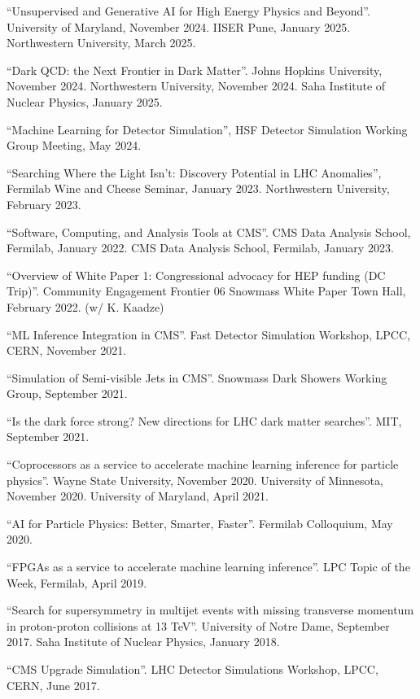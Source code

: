 \begin{description}[leftmargin=12pt,font=\normalfont,labelsep=0em]
\item ``Unsupervised and Generative AI for High Energy Physics and Beyond''. University of Maryland, November 2024. IISER Pune, January 2025. Northwestern University, March 2025.
\item ``Dark QCD: the Next Frontier in Dark Matter''. Johns Hopkins University, November 2024. Northwestern University, November 2024. Saha Institute of Nuclear Physics, January 2025.
\item ``Machine Learning for Detector Simulation'', HSF Detector Simulation Working Group Meeting, May 2024.
\item ``Searching Where the Light Isn't: Discovery Potential in LHC Anomalies'', Fermilab Wine and Cheese Seminar, January 2023. Northwestern University, February 2023.
\item ``Software, Computing, and Analysis Tools at CMS''. CMS Data Analysis School, Fermilab, January 2022. CMS Data Analysis School, Fermilab, January 2023.
\item ``Overview of White Paper 1: Congressional advocacy for HEP funding (DC Trip)''. Community Engagement Frontier 06 Snowmass White Paper Town Hall, February 2022. (w/ K. Kaadze)
\item ``ML Inference Integration in CMS''. Fast Detector Simulation Workshop, LPCC, CERN, November 2021.
\item ``Simulation of Semi-visible Jets in CMS''. Snowmass Dark Showers Working Group, September 2021.
\item ``Is the dark force strong? New directions for LHC dark matter searches''. MIT, September 2021.
\item ``Coprocessors as a service to accelerate machine learning inference for particle physics''. Wayne State University, November 2020. University of Minnesota, November 2020. University of Maryland, April 2021.
\item ``AI for Particle Physics: Better, Smarter, Faster''. Fermilab Colloquium, May 2020.
\item ``FPGAs as a service to accelerate machine learning inference''. LPC Topic of the Week, Fermilab, April 2019.
\item ``Search for supersymmetry in multijet events with missing transverse momentum in proton-proton collisions at 13 TeV''. University of Notre Dame, September 2017. Saha Institute of Nuclear Physics, January 2018.
\item ``CMS Upgrade Simulation''. LHC Detector Simulations Workshop, LPCC, CERN, June 2017.

\end{description}
